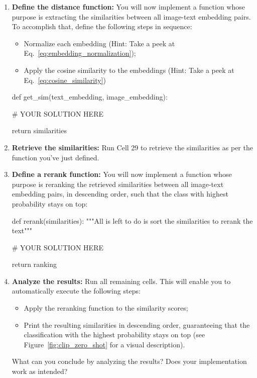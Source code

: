 \begin{exercise}
\begin{enumerate}
\begin{itemize}
        \item Project both the text and image embeddings to the shared embedding space (see Figure~\ref{fig:clip_contrastive_pre_training} for a visual explanation)
    \end{itemize}

    \item \textbf{Define the distance function:} You will now implement a function whose purpose is extracting the similarities between all image-text embedding pairs. To accomplish that, define the following steps in sequence:
    \begin{itemize}
        \item Normalize each embedding (Hint: Take a peek at Eq.~\ref{eq:embedding_normalization});

        \item Apply the cosine similarity to the embeddings (Hint: Take a peek at Eq.~\ref{eq:cosine_similarity})
    \end{itemize}
    \begin{python}
def get_sim(text_embedding, image_embedding):

    # YOUR SOLUTION HERE
    
    return similarities
    \end{python}

    \item \textbf{Retrieve the similarities:} Run Cell 29 to retrieve the similarities as per the function you've just defined.

    \item \textbf{Define a rerank function:} You will now implement a function whose purpose is reranking the retrieved similarities between all image-text embedding pairs, in descending order, such that the class with highest probability stays on top:
    \begin{python}
def rerank(similarities):
    """All is left to do is sort the similarities to rerank the text"""
    
    # YOUR SOLUTION HERE

    return ranking
    \end{python}

    \item \textbf{Analyze the results:} Run all remaining cells. This will enable you to automatically execute the following steps:
    \begin{itemize}
        \item Apply the reranking function to the similarity scores;

        \item Print the resulting similarities in descending order, guaranteeing that the classification with the highest probability stays on top (see Figure~\ref{fig:clip_zero_shot} for a visual description).
    \end{itemize}
    What can you conclude by analyzing the results? Does your implementation work as intended?
\end{enumerate}
\end{exercise}

